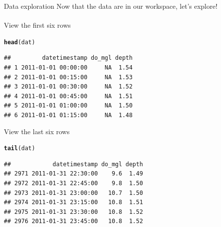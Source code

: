 \documentclass[xcolor=svgnames]{beamer}\usepackage[]{graphicx}\usepackage[]{color}
\makeatletter
\newcommand{\hlstd}[1]{\textcolor[rgb]{0.345,0.345,0.345}{#1}}%
\newcommand{\hlkwd}[1]{\textcolor[rgb]{0.737,0.353,0.396}{\textbf{#1}}}%
\newenvironment{kframe}{%
 \def\at@end@of@kframe{}%
 \ifinner\ifhmode%
  \def\at@end@of@kframe{\end{minipage}}%
  \begin{minipage}{\columnwidth}%
 \fi\fi%
 \def\FrameCommand##1{\hskip\@totalleftmargin \hskip-\fboxsep
 \colorbox{shadecolor}{##1}\hskip-\fboxsep
     \hskip-\linewidth \hskip-\@totalleftmargin \hskip\columnwidth}%
 \MakeFramed {\advance\hsize-\width
   \@totalleftmargin\z@ \linewidth\hsize
   \@setminipage}}%
 {\par\unskip\endMakeFramed%
 \at@end@of@kframe}
\newenvironment{knitrout}{}{} %
\makeatother
\begin{document}
\begin{frame}{Data exploration}
Now that the data are in our workspace, let's explore!\\~\\
View the first six rows
\begin{knitrout}\scriptsize
{}\color{fgcolor}\begin{kframe}
\begin{alltt}
\hlkwd{head}\hlstd{(dat)}
\end{alltt}
\begin{verbatim}
##         datetimestamp do_mgl depth
## 1 2011-01-01 00:00:00     NA  1.54
## 2 2011-01-01 00:15:00     NA  1.53
## 3 2011-01-01 00:30:00     NA  1.52
## 4 2011-01-01 00:45:00     NA  1.51
## 5 2011-01-01 01:00:00     NA  1.50
## 6 2011-01-01 01:15:00     NA  1.48
\end{verbatim}
\end{kframe}
\end{knitrout}
View the last six rows
\begin{knitrout}\scriptsize
{}\color{fgcolor}\begin{kframe}
\begin{alltt}
\hlkwd{tail}\hlstd{(dat)}
\end{alltt}
\begin{verbatim}
##            datetimestamp do_mgl depth
## 2971 2011-01-31 22:30:00    9.6  1.49
## 2972 2011-01-31 22:45:00    9.8  1.50
## 2973 2011-01-31 23:00:00   10.7  1.50
## 2974 2011-01-31 23:15:00   10.8  1.51
## 2975 2011-01-31 23:30:00   10.8  1.52
## 2976 2011-01-31 23:45:00   10.8  1.52
\end{verbatim}
\end{kframe}
\end{knitrout}
\end{frame}
 
\end{document}
